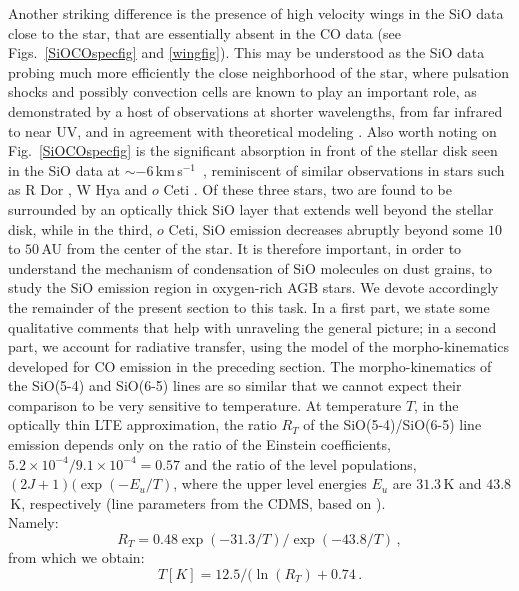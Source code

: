 \documentclass{aa}
\newcommand{\kms}{\,km\,s$^{-1}$~}
\begin{document}
Another striking difference is the presence of high velocity wings in
the SiO data close to the star, that are essentially absent in the CO
data (see Figs.~\ref{SiOCOspecfig} and \ref{wingfig}). This may be
understood as the SiO data probing much more efficiently the close
neighborhood of the star, where pulsation shocks and possibly
convection cells are known to play an important role, as demonstrated
by a host of observations at shorter wavelengths, from far infrared to
near UV, and in agreement with theoretical modeling \citep[see,
e.g.,][and references
therein]{hhr82,wkgs2000,rwwbs2003,nlhh2005,flh2017,2017ApJ...841...33M,ho18}. 
Also worth noting on Fig.~\ref{SiOCOspecfig} is the significant absorption
in front of the stellar disk seen in the SiO data at $\sim -6$\kms,
reminiscent of similar observations in stars such as R Dor
\citep{nhungetal2021}, W Hya \citep{takigawaetal2017} and $o$ Ceti
\citep{wongetal2016}.  Of these three stars, two are found to be
surrounded by an optically thick SiO layer that extends well beyond
the stellar disk, while in the third, $o$ Ceti, SiO emission decreases
abruptly beyond some $10$ to $50$\,AU from the center of the star. It
is therefore important, in order to understand the mechanism of
condensation of SiO molecules on dust grains, to study the SiO
emission region in oxygen-rich AGB stars. We devote accordingly the
remainder of the present section to this task. In a first part, we
state some qualitative comments that help with unraveling the general
picture; in a second part, we account for radiative transfer, using
the model of the morpho-kinematics developed for CO emission in the
preceding section.  The morpho-kinematics of the SiO(5-4) and SiO(6-5)
lines are so similar that we cannot expect their comparison to be very
sensitive to temperature.  At temperature $T$, in the optically thin
LTE approximation, the ratio $R_T$ of the SiO(5-4)/SiO(6-5) line
emission depends only on the ratio of the Einstein coefficients,
$5.2\times10^{-4}/9.1\times10^{-4}=0.57$ and the ratio of the level
populations, $(2J+1)(\exp(-E_u/T)$, where the upper level energies
$E_u$ are $31.3$\,K and $43.8$\,K, respectively (line parameters from
the CDMS, based on \citet{siocdms2013}).\\
Namely:
\begin{equation}
R_T = 0.48\exp(-31.3/T)/\exp(-43.8/T)\, ,
\end{equation}
from which we obtain:
\begin{equation}
T[K] = 12.5/(\ln(R_T) + 0.74\,.
\end{equation}
\end{document}
